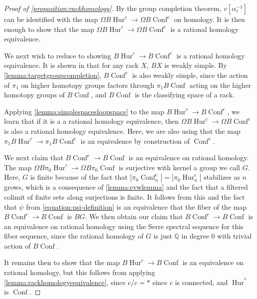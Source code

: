 \documentclass[12 pt]{amsart}
\theoremstyle{plain}
\theoremstyle{definition}
\theoremstyle{remark}
\numberwithin{equation}{section}
\DeclareMathOperator\Hur{Hur}
\DeclareMathOperator\Conf{Conf}
\newcommand\QQ{\mathbb{Q}}
\begin{document}
\begin{proof}[Proof of \autoref{proposition:rackhomology}]
	By the group completion theorem, $v[\alpha_{c}^{-1}]$ can be identified with
	the map $\Omega B\Hur^{c} \to \Omega B\Conf^{c}$ on homology. It is then enough to show that the map $\Omega B\Hur^{c} \to \Omega B\Conf^{c}$ is a rational homology equivalence. 




	We next wish to reduce to showing 
$B \Hur^c \to B \Conf^c$ is a
rational homology equivalence.
It is shown in \cite[Proposition 5.2]{fennRS:the-rack-space}
that for any rack $X$, $BX$ is weakly simple. By \autoref{lemma:targetgroupcompletion}, $B\Conf^c$ is also weakly simple, since the action of $\pi_1$ on higher homotopy groups factors through $\pi_1B\Conf$ acting on the higher homotopy groups of $B\Conf$, and $B\Conf$ is the classifying space of a rack.



Applying \autoref{lemma:simplespacesloopspace} to the map
$B \Hur^c \to B \Conf^c$, we learn that if it is a
a rational homology equivalence, then
$\Omega B\Hur^{c} \to \Omega B\Conf^{c}$
is also a rational homology equivalence.
Here, we are also using that
the map $\pi_1 B \Hur^c \to \pi_1 B \Conf^c$ is an equivalence by construction of $\Conf^c$. 
	
We next claim that $B\Conf^{c} \to B\Conf$ is an equivalence on rational
homology.
	The map $\Omega B\pi_0\Hur^{c} \to \Omega B\pi_0\Conf$ is surjective
	with kernel a group we call $G$. 
	Here, $G$ is finite because of the fact that $|\pi_0\Conf^c_n| = |\pi_0\Hur^c_n|$
	stabilizes as $n$ grows, which is a consequence of
	\autoref{lemma:evwlemma} and the fact that a filtered colimit of finite
	sets along surjections is finite. It follows from this and the fact that $\psi$ from
	\eqref{equation:psi-definition} is an equivalence that the fiber of the map $B\Conf^{c}
	\to B\Conf$ is $BG$. 
	We then obtain our claim that $B\Conf^{c} \to B\Conf$ is an equivalence on rational homology
	using the Serre spectral sequence for this
	fiber sequence, since the rational homology of $G$ is just $\QQ$ in
	degree $0$ with trivial action of $B\Conf$.
	
	It remains then to show that the map $B\Hur^c \to B\Conf$ is an equivalence on rational homology, but this follows from applying \autoref{lemma:rackhomologyequivalence}, since $c/c=*$ since $c$ is connected, and $\Hur^*$ is $\Conf$.
\end{proof}
\end{document}
